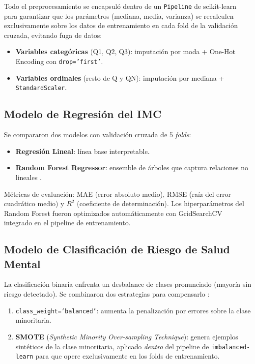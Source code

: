 \documentclass[conference]{IEEEtran}
\begin{document}
Todo el preprocesamiento se encapsuló dentro de un \texttt{Pipeline} de scikit-learn \cite{pedregosa2011scikit} para garantizar que los parámetros (mediana, media, varianza) se recalculen exclusivamente sobre los datos de entrenamiento en cada fold de la validación cruzada, evitando fuga de datos:

\begin{itemize}
  \item \textbf{Variables categóricas} (Q1, Q2, Q3): imputación por moda + One-Hot Encoding con \texttt{drop='first'}.
  \item \textbf{Variables ordinales} (resto de Q y QN): imputación por mediana + \texttt{StandardScaler}.
\end{itemize}

\subsection{Modelo de Regresión del IMC}

Se compararon dos modelos con validación cruzada de 5 \textit{folds}:
\begin{itemize}
  \item \textbf{Regresión Lineal}: línea base interpretable.
  \item \textbf{Random Forest Regressor}: ensemble de árboles que captura relaciones no lineales \cite{breiman2001random}.
\end{itemize}
Métricas de evaluación: MAE (error absoluto medio), RMSE (raíz del error cuadrático medio) y $R^2$ (coeficiente de determinación). Los hiperparámetros del Random Forest fueron optimizados automáticamente con GridSearchCV integrado en el pipeline de entrenamiento.

\subsection{Modelo de Clasificación de Riesgo de Salud Mental}

La clasificación binaria enfrenta un desbalance de clases pronunciado (mayoría sin riesgo detectado). Se combinaron dos estrategias para compensarlo \cite{chawla2002smote}:
\begin{enumerate}
  \item \texttt{class\_weight='balanced'}: aumenta la penalización por errores sobre la clase minoritaria.
  \item \textbf{SMOTE} (\textit{Synthetic Minority Over-sampling Technique}): genera ejemplos sintéticos de la clase minoritaria, aplicado \textit{dentro} del pipeline de \texttt{imbalanced-learn} \cite{lemaitre2017imbalanced} para que opere exclusivamente en los folds de entrenamiento.
\end{enumerate}
\end{document}
